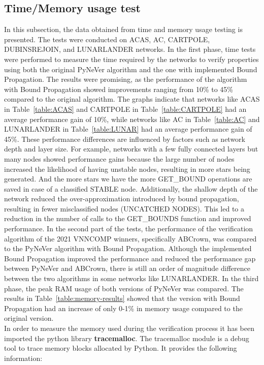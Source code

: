 \subsection{Time/Memory usage test}
In this subsection, the data obtained from time and memory usage testing is presented. The tests were conducted on ACAS, AC, CARTPOLE, DUBINSREJOIN, and LUNARLANDER networks. In the first phase, time tests were performed to measure the time required by the networks to verify properties using both the original PyNeVer algorithm and the one with implemented Bound Propagation. The results were promising, as the performance of the algorithm with Bound Propagation showed improvements ranging from 10\% to 45\% compared to the original algorithm. 
The graphs indicate that networks like ACAS in Table~\ref{table:ACAS} and CARTPOLE in Table~\ref{table:CARTPOLE} had an average performance gain of 10\%, while networks like AC in Table~\ref{table:AC} and LUNARLANDER in Table~\ref{table:LUNAR} had an average performance gain of 45\%. These performance differences are influenced by factors such as network depth and layer size.
For example, networks with a few fully connected layers but many nodes showed performance gains because the large number of nodes increased the likelihood of having unstable nodes, resulting in more stars being generated. And the more stars we have the more GET\_BOUND operations are saved in case of a classified STABLE node. Additionally, the shallow depth of the network reduced the over-approximation introduced by bound propagation, resulting in fewer misclassified nodes (UNCATCHED NODES). This led to a reduction in the number of calls to the GET\_BOUNDS function and improved performance.
In the second part of the tests, the performance of the verification algorithm of the 2021 VNNCOMP winners, specifically ABCrown, was compared to the PyNeVer algorithm with Bound Propagation. Although the implemented Bound Propagation improved the performance and reduced the performance gap between PyNeVer and ABCrown, there is still an order of magnitude difference between the two algorithms in some networks like LUNARLANDER.
In the third phase, the peak RAM usage of both versions of PyNeVer was compared. The results in Table~\ref{table:memory-results} showed that the version with Bound Propagation had an increase of only 0-1\% in memory usage compared to the original version.\\
In order to measure the memory used during the verification process it has been imported the python library \textbf{tracemalloc}. 
The tracemalloc module is a debug tool to trace memory blocks allocated by Python. It provides the following information:

